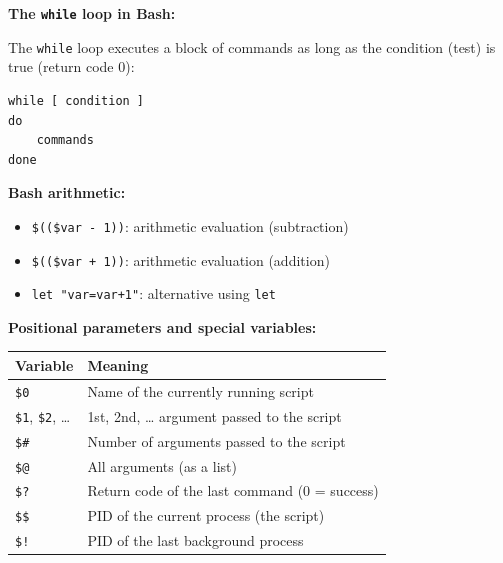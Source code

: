 \documentclass[a4paper,11pt]{article}
\theoremstyle{plain}
\theoremstyle{definition}
\begin{document}
\begin{rappel}
\textbf{The \texttt{while} loop in Bash:}

The \texttt{while} loop executes a block of commands as long as the condition (test) is true (return code 0):
\begin{lstlisting}[numbers=none]
while [ condition ]
do
    commands
done
\end{lstlisting}

\medskip
\textbf{Bash arithmetic:}
\begin{itemize}
    \item \texttt{\$((\$var - 1))}: arithmetic evaluation (subtraction)
    \item \texttt{\$((\$var + 1))}: arithmetic evaluation (addition)
    \item \texttt{let "var=var+1"}: alternative using \texttt{let}
\end{itemize}

\medskip
\textbf{Positional parameters and special variables:}

\begin{center}
\begin{tabular}{ll}
\toprule
\textbf{Variable} & \textbf{Meaning} \\
\midrule
\texttt{\$0} & Name of the currently running script \\
\texttt{\$1}, \texttt{\$2}, \ldots & 1st, 2nd, \ldots{} argument passed to the script \\
\texttt{\$\#} & Number of arguments passed to the script \\
\texttt{\$@} & All arguments (as a list) \\
\texttt{\$?} & Return code of the last command (0 = success) \\
\texttt{\$\$} & PID of the current process (the script) \\
\texttt{\$!} & PID of the last background process \\
\bottomrule
\end{tabular}
\end{center}
\end{rappel}
\end{document}
